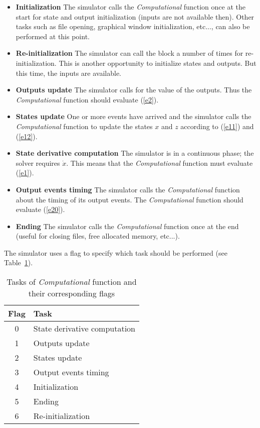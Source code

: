 \documentclass{article}
\newcommand{\computational}{{\em Computational }}
\begin{document}
\begin{itemize}
\item \textbf{Initialization} The simulator calls the \computational function once
at the start for state and output initialization (inputs
are not available then).  Other tasks such as file opening, graphical window
initialization, etc..., can also be performed at this point.

\item \textbf{Re-initialization} The simulator can call the block a number of times for 
re-initialization. This is another opportunity to initialize
states and outputs. But this time, the inputs are
available. 

\item \textbf{Outputs update} The simulator calls for the value of
the outputs. Thus the \computational function should evaluate
(\ref{e2}).

\item \textbf{States update} One or more events have arrived and  the
simulator calls the \computational function to update the
states $x$ and $z$  according to (\ref{e11}) and
(\ref{e12}). 

\item \textbf{State derivative computation}
The simulator is in a continuous phase; the
solver requires $\dot{x}$. This means that the \computational function 
must evaluate (\ref{e1}).

\item \textbf{Output events timing} The simulator calls the \computational
function  about the timing of its output events. The
\computational function should evaluate (\ref{e20}).

\item \textbf{Ending} The simulator calls
the \computational function once at the end (useful for closing files, free allocated 
memory, etc...).

\end{itemize}

The simulator uses a flag to specify which task should be performed
(see Table~\ref{tab2}).

\begin{table}[ht]
\begin{center}
\begin{tabular}{|c|l|}
\hline
Flag & Task \\
\hline
0 & State derivative computation \\
1 & Outputs update \\
2 & States update \\
3 & Output events timing \\
4 & Initialization \\
5 & Ending \\
6 & Re-initialization \\
\hline
\end{tabular}
\caption{Tasks of \computational function and their corresponding flags}
\label{tab2}
\end{center}
\end{table}
\end{document}
